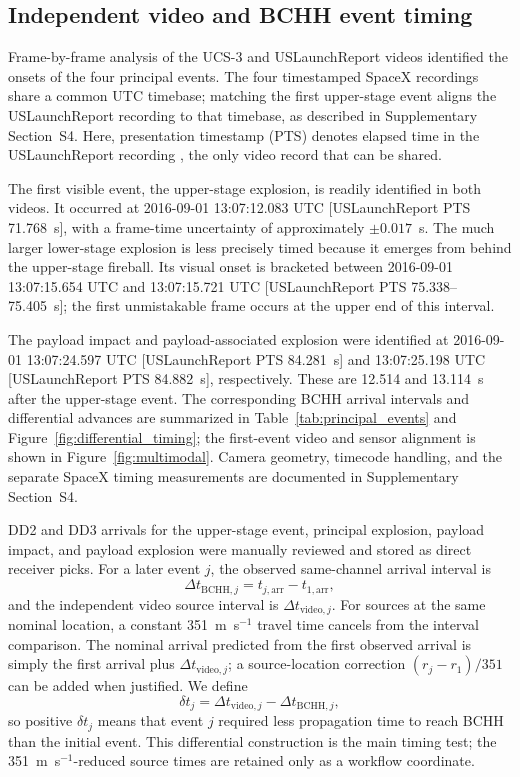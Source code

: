 \documentclass[]{seismica}
\begin{document}
\subsection{Independent video and BCHH event timing}

Frame-by-frame analysis of the UCS-3 and USLaunchReport videos identified
the onsets of the four principal events. The four timestamped SpaceX
recordings share a common UTC timebase; matching the first upper-stage
event aligns the USLaunchReport recording to that timebase, as described
in Supplementary Section~S4. Here, presentation timestamp (PTS) denotes
elapsed time in the USLaunchReport recording
\citep{uslaunchreport_amos6_video_2016}, the only video record that can be
shared.

The first visible event, the upper-stage explosion, is readily identified
in both videos. It occurred at 2016-09-01 13:07:12.083 UTC
[USLaunchReport PTS 71.768~s], with a frame-time uncertainty of
approximately $\pm 0.017$~s. The much larger lower-stage explosion is less
precisely timed because it emerges from behind the upper-stage fireball.
Its visual onset is bracketed between 2016-09-01 13:07:15.654 UTC and
13:07:15.721 UTC [USLaunchReport PTS 75.338--75.405~s]; the first
unmistakable frame occurs at the upper end of this interval.

The payload impact and payload-associated explosion were identified at
2016-09-01 13:07:24.597 UTC [USLaunchReport PTS 84.281~s] and
13:07:25.198 UTC [USLaunchReport PTS 84.882~s], respectively. These are
12.514 and 13.114~s after the upper-stage event. The corresponding BCHH
arrival intervals and differential advances are summarized in
Table~\ref{tab:principal_events} and Figure~\ref{fig:differential_timing};
the first-event video and sensor alignment is shown in
Figure~\ref{fig:multimodal}. Camera geometry, timecode handling, and the
separate SpaceX timing measurements are documented in Supplementary
Section~S4.

DD2 and DD3 arrivals for the upper-stage event, principal explosion, payload
impact, and payload explosion were manually reviewed and stored as direct
receiver picks. For a later event $j$, the observed same-channel arrival
interval is
\begin{equation}
 \Delta t_{\mathrm{BCHH},j}=t_{j,\mathrm{arr}}-t_{1,\mathrm{arr}},
\end{equation}
and the independent video source interval is
$\Delta t_{\mathrm{video},j}$. For sources at the same nominal location, a
constant 351~m~s$^{-1}$ travel time cancels from the interval comparison. The
nominal arrival predicted from the first observed arrival is simply the first
arrival plus $\Delta t_{\mathrm{video},j}$; a source-location correction
$(r_j-r_1)/351$ can be added when justified. We define
\begin{equation}
 \delta t_j=\Delta t_{\mathrm{video},j}-\Delta t_{\mathrm{BCHH},j},
 \label{eq:differential_advance}
\end{equation}
so positive $\delta t_j$ means that event $j$ required less propagation time
to reach BCHH than the initial event. This differential construction is the
main timing test; the 351~m~s$^{-1}$-reduced source times are retained only as
a workflow coordinate.
\end{document}
